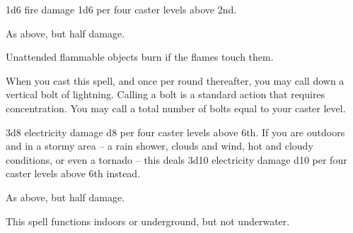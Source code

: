 \begin{spellsuccess}
    1d6 fire damage \add 1d6 per four caster levels above 2nd.
\end{spellsuccess}
\begin{spellfailure}
    As above, but half damage.
\end{spellfailure}
\begin{spellnotes}
    Unattended flammable objects burn if the flames touch them. \destructivespellnotes
\end{spellnotes}

\begin{comment}
\subsubsection{C}
\end{comment}

\begin{spelleffect}
    When you cast this spell, and once per round thereafter, you may call down a vertical bolt of lightning. Calling a bolt is a standard action that requires concentration. You may call a total number of bolts equal to your caster level.
\end{spelleffect}
\begin{spellsuccess}
    3d8 electricity damage \add d8 per four caster levels above 6th. If you are outdoors and in a stormy area -- a rain shower, clouds and wind, hot and cloudy conditions, or even a tornado -- this deals 3d10 electricity damage \add d10 per four caster levels above 6th instead.
\end{spellsuccess}
\begin{spellfailure}
    As above, but half damage.
\end{spellfailure}
\begin{spellnotes}
    This spell functions indoors or underground, but not underwater. \destructivespellnotes
\end{spellnotes}

